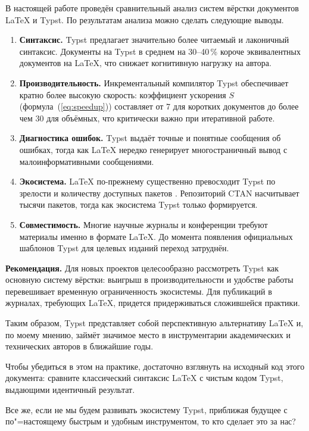 В настоящей работе проведён сравнительный анализ систем вёрстки документов {\LaTeX} и Typst. По результатам анализа можно сделать следующие выводы.

\begin{enumerate}
    \item \textbf{Синтаксис.} Typst предлагает значительно более читаемый и лаконичный синтаксис. Документы на Typst в среднем на 30–40\,\% короче эквивалентных документов на {\LaTeX}, что снижает когнитивную нагрузку на автора.

    \item \textbf{Производительность.} Инкрементальный компилятор Typst обеспечивает кратно более высокую скорость: коэффициент ускорения $S$ (формула~(\ref{eq:speedup})) составляет от 7 для коротких документов до более чем 30 для объёмных, что критически важно при итеративной работе.

    \item \textbf{Диагностика ошибок.} Typst выдаёт точные и понятные сообщения об ошибках, тогда как {\LaTeX} нередко генерирует многостраничный вывод с малоинформативными сообщениями.

    \item \textbf{Экосистема.} {\LaTeX} по-прежнему существенно превосходит Typst по зрелости и количеству доступных пакетов \cite{mittelbach2004latex}. Репозиторий CTAN насчитывает тысячи пакетов, тогда как экосистема Typst только формируется.

    \item \textbf{Совместимость.} Многие научные журналы и конференции требуют материалы именно в формате {\LaTeX}. До момента появления официальных шаблонов Typst для целевых изданий переход затруднён.
\end{enumerate}

\textbf{Рекомендация.} Для новых проектов целесообразно рассмотреть Typst как основную систему вёрстки: выигрыш в производительности и удобстве работы перевешивает временную ограниченность экосистемы. Для публикаций в журналах, требующих {\LaTeX}, придется придерживаться сложившейся практики.

Таким образом, Typst представляет собой перспективную альтернативу {\LaTeX} и, по моему мнению, займёт значимое место в инструментарии академических и технических авторов в ближайшие годы.

Чтобы убедиться в этом на практике, достаточно взглянуть на исходный код этого документа: сравните классический синтаксис LaTeX с чистым кодом Typst, выдающими идентичный результат.

Все же, если не мы будем развивать экосистему Typst, приближая будущее с по"=настоящему быстрым и удобным инструментом, то кто сделает это за нас?
